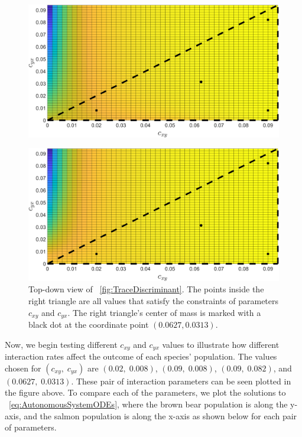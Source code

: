 \begin{figure}[H]
    \centering
    \includegraphics[width=14cm]{Pictures/Stability/TraceTopDown.png}
\end{figure}
\begin{figure}[H]
    \centering
    \includegraphics[width=14cm]{Pictures/Stability/DiscriminantTopDown.png}
    \caption{\singlespacing
    Top-down view of \figureautorefname~\ref{fig:TraceDiscriminant}. The points inside the right triangle are all values that satisfy the constraints of parameters $c_{xy}$ and $c_{yx}$. The right triangle's center of mass is marked with a black dot at the coordinate point $(0.0627,0.0313)$.}
    \label{fig:TraceDiscriminantTopDown}
\end{figure}
Now, we begin testing different $c_{xy}$ and $c_{yx}$ values to illustrate how different interaction rates affect the outcome of each species' population.
The values chosen for $(c_{xy},\;c_{yx})$ are $(0.02,\;0.008)$, $(0.09,\;0.008)$, $(0.09,\;0.082)$, and $(0.0627,\;0.0313)$. These pair of interaction parameters can be seen plotted in the figure above.
To compare each of the parameters, we plot the solutions to \equationautorefname~\eqref{eq:AutonomousSystemODEs}, where the brown bear population is along the y-axis, and the salmon population is along the x-axis as shown below for each pair of parameters.
